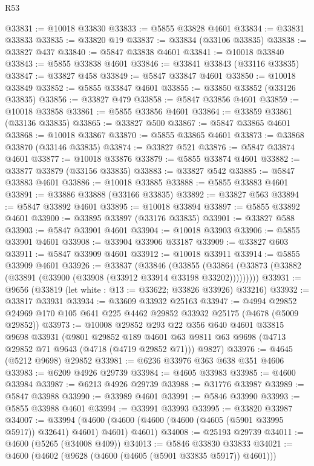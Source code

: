 \begin{lexlean}{R53}
\begin{coremodule}
@33831 := @10018 @33830
@33833 := @5855 @33828 @4601
@33834 := @33831 @33833
@33835 := @33820 @19
@33837 := @33834 (@33106 @33835)
@33838 := @33827 @437
@33840 := @5847 @33838 @4601
@33841 := @10018 @33840
@33843 := @5855 @33838 @4601
@33846 := @33841 @33843 (@33116 @33835)
@33847 := @33827 @458
@33849 := @5847 @33847 @4601
@33850 := @10018 @33849
@33852 := @5855 @33847 @4601
@33855 := @33850 @33852 (@33126 @33835)
@33856 := @33827 @479
@33858 := @5847 @33856 @4601
@33859 := @10018 @33858
@33861 := @5855 @33856 @4601
@33864 := @33859 @33861 (@33136 @33835)
@33865 := @33827 @500
@33867 := @5847 @33865 @4601
@33868 := @10018 @33867
@33870 := @5855 @33865 @4601
@33873 := @33868 @33870 (@33146 @33835)
@33874 := @33827 @521
@33876 := @5847 @33874 @4601
@33877 := @10018 @33876
@33879 := @5855 @33874 @4601
@33882 := @33877 @33879 (@33156 @33835)
@33883 := @33827 @542
@33885 := @5847 @33883 @4601
@33886 := @10018 @33885
@33888 := @5855 @33883 @4601
@33891 := @33886 @33888 (@33166 @33835)
@33892 := @33827 @563
@33894 := @5847 @33892 @4601
@33895 := @10018 @33894
@33897 := @5855 @33892 @4601
@33900 := @33895 @33897 (@33176 @33835)
@33901 := @33827 @588
@33903 := @5847 @33901 @4601
@33904 := @10018 @33903
@33906 := @5855 @33901 @4601
@33908 := @33904 @33906 @33187
@33909 := @33827 @603
@33911 := @5847 @33909 @4601
@33912 := @10018 @33911
@33914 := @5855 @33909 @4601
@33926 := @33837
    (@33846
      (@33855 (@33864 (@33873 (@33882 (@33891 (@33900 (@33908 (@33912 @33914 @33198 @33202)))))))))
@33931 := @9656 (@33819 (let white : @13 := @33622; @33826 @33926) @33216)
@33932 := @33817 @33931
@33934 := @33609 @33932 @25163
@33947 := @4994 @29852 @24969 @170 @105 @641 @225 @4462 @29852 @33932 @25175 (@4678 (@5009 @29852))
@33973 := @10008
    @29852
    @293
    @22
    @356
    @640
    @4601
    @33815
    @9698
    @33931
    (@9801
      @29852
      @189
      @4601
      @63
      @9811
      @63
      @9698
      (@4713 @29852 @71 @9643 (@4718 (@4719 @29852 @71)))
      @9827)
@33976 := @4645 (@5212 @9698) @29852
@33981 := @6236 @33976 @363 @638 @351 @4606
@33983 := @6209 @4926 @29739
@33984 := @4605 @33983
@33985 := @4600 @33984
@33987 := @6213 @4926 @29739
@33988 := @31776 @33987
@33989 := @5847 @33988
@33990 := @33989 @4601
@33991 := @5846 @33990
@33993 := @5855 @33988 @4601
@33994 := @33991 @33993
@33995 := @33820 @33987
@34007 := @33994
    (@4600 (@4600 (@4600 (@4600 (@4605 (@5901 @33995 @5917)) @32641) @4601) @4601) @4601)
@34008 := @25193 @29739
@34011 := @4600 (@5265 (@34008 @409))
@34013 := @5846 @33830 @33833
@34021 := @4600 (@4602 (@9628 (@4600 (@4605 (@5901 @33835 @5917)) @4601)))

\end{coremodule}
\end{lexlean}
